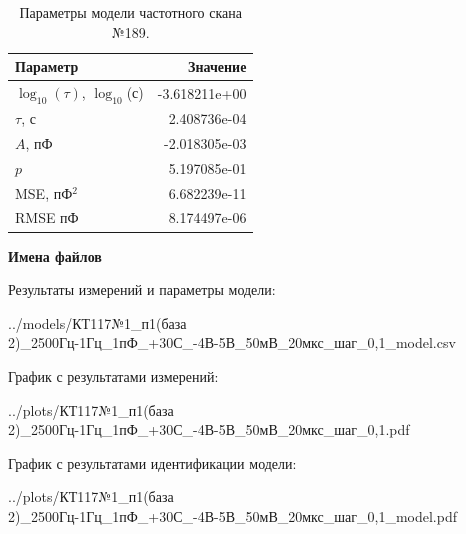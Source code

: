 \begin{table}[!ht]
    \centering
    \caption{Параметры модели частотного скана №189.}
    \begin{tabular}{|l|r|}
        \hline
        Параметр                                       & Значение                  \\ \hline
        $\log_{10}(\tau)$, $\log_{10}$(с)              & -3.618211e+00             \\ \hline
        $\tau$, с                                      & 2.408736e-04              \\ \hline
        $A$, пФ                                        & -2.018305e-03             \\ \hline
        $p$                                            & 5.197085e-01              \\ \hline
        MSE, пФ$^2$                                    & 6.682239e-11              \\ \hline
        RMSE пФ                                        & 8.174497e-06              \\ \hline
    \end{tabular}
    \label{table:frequency_scan_model_189}
\end{table}

\textbf{Имена файлов}

Результаты измерений и параметры модели:

\scriptsize../models/КТ117№1\_п1(база 2)\_2500Гц-1Гц\_1пФ\_+30С\_-4В-5В\_50мВ\_20мкс\_шаг\_0,1\_model.csv
\normalsize

График с результатами измерений:

\scriptsize../plots/КТ117№1\_п1(база 2)\_2500Гц-1Гц\_1пФ\_+30С\_-4В-5В\_50мВ\_20мкс\_шаг\_0,1.pdf
\normalsize

График с результатами идентификации модели:

\scriptsize../plots/КТ117№1\_п1(база 2)\_2500Гц-1Гц\_1пФ\_+30С\_-4В-5В\_50мВ\_20мкс\_шаг\_0,1\_model.pdf
\normalsize

